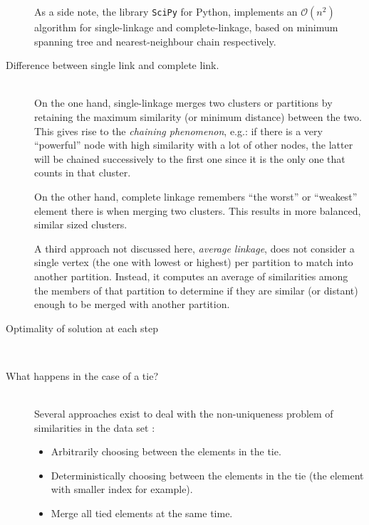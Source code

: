 \documentclass[12pt,a4paper]{article}
\begin{document}
\begin{description}
  As a side note, the library \texttt{SciPy} for Python, implements an
  $\mathcal{O}(n^2)$ algorithm for single-linkage and
  complete-linkage, based on minimum spanning tree and
  nearest-neighbour chain respectively.



\item[Difference between single link and complete link.] \hfill \\
  On the one hand, single-linkage merges two clusters or partitions by
  retaining the maximum similarity (or minimum distance) between the
  two. This gives rise to the \emph{chaining phenomenon}, e.g.: if
  there is a very ``powerful'' node with high similarity with a lot of
  other nodes, the latter will be chained successively to the first
  one since it is the only one that counts in that cluster.

  On the other hand, complete linkage remembers ``the worst'' or
  ``weakest'' element there is when merging two clusters. This results
  in more balanced, similar sized clusters.

  A third approach not discussed here, \emph{average linkage}, does
  not consider a single vertex (the one with lowest or highest) per
  partition to match into another partition. Instead, it computes an
  average of similarities among the members of that partition to
  determine if they are similar (or distant) enough to be merged with
  another partition.

\item[Optimality of solution at each step] \hfill \\



\item[What happens in the case of a tie?]  \hfill \\

  Several approaches exist to deal with the non-uniqueness problem of
  similarities in the data set \cite{nonunique}:

  \begin{itemize}
  \item Arbitrarily choosing between the elements in the tie.
  \item Deterministically choosing between the elements in the tie
    (the element with smaller index for example).
  \item Merge all tied elements at the same time.
  \end{itemize}



\end{description}
\end{document}

